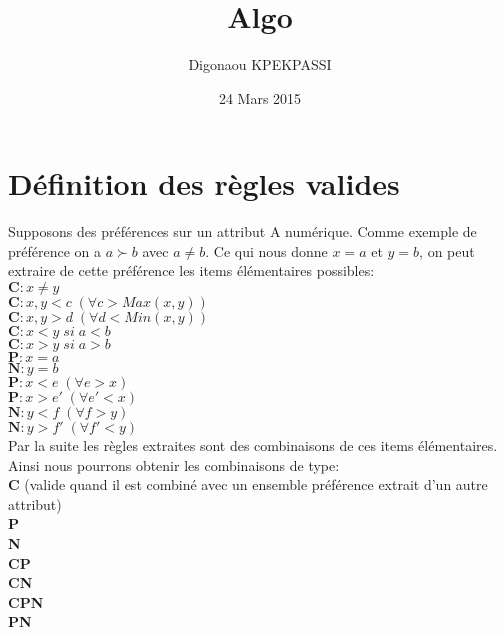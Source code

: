 \documentclass[a4paper]{article}
\title{Algo}
\author{Digonaou KPEKPASSI}
\date{24 Mars 2015}
\begin{document}
\section{Définition des règles valides}
Supposons des préférences sur un attribut A numérique. Comme exemple de préférence on a $a\succ b$ avec $a\neq b$. Ce qui nous donne  $x=a$ et $y=b$, on peut extraire de cette préférence les items élémentaires possibles:\\
$\mathbf{C}:x\neq y$\\
$\mathbf{C}:x,y<c\; (\forall c > Max(x,y))$\\
$\mathbf{C}:x,y>d\; (\forall d < Min(x,y))$\\
$\mathbf{C}:x<y\; si\; a<b$\\
$\mathbf{C}:x>y\; si\; a>b$\\

\noindent $\mathbf{P}:x=a$\\
$\mathbf{N}:y=b$\\
$\mathbf{P}:x<e\; (\forall e>x)$\\
$\mathbf{P}:x>e'\; (\forall e'<x)$\\
$\mathbf{N}:y<f\; (\forall f>y)$\\
$\mathbf{N}:y>f'\; (\forall f'<y)$\\


Par la suite les règles extraites sont des combinaisons de ces items élémentaires. Ainsi nous pourrons obtenir les combinaisons de type:\\

\noindent \textbf{C} (valide quand il est combiné avec un ensemble préférence extrait d'un autre attribut)\\
\textbf{P}\\
\textbf{N}\\
\textbf{CP}\\
\textbf{CN}\\
\textbf{CPN}\\
\textbf{PN}\\
\end{document}
